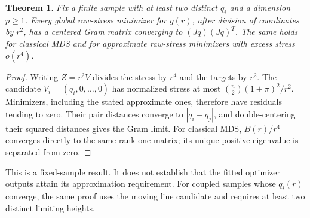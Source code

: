 \documentclass[11pt]{article}
\newtheorem{theorem}[proposition]{Theorem}
\begin{document}
\begin{theorem}\label{thm:paraboloid}
Fix a finite sample with at least two distinct $q_i$ and a dimension $p\ge1$.
Every global raw-stress minimizer for $g(r)$, after division of coordinates
by $r^2$, has a centered Gram matrix converging to $(Jq)(Jq)^T$. The same
holds for classical MDS and for approximate raw-stress minimizers with
excess stress $o(r^4)$.
\end{theorem}
\begin{proof}
Writing $Z=r^2V$ divides the stress by $r^4$ and the targets by $r^2$.
The candidate $V_i=(q_i,0,\ldots,0)$ has normalized stress at most
$\binom n2(1+\pi)^2/r^2$. Minimizers, including the stated approximate ones,
therefore have residuals tending to zero. Their pair distances converge to
$|q_i-q_j|$, and double-centering their squared distances gives the Gram limit.
For classical MDS, $B(r)/r^4$ converges directly to the same rank-one matrix;
its unique positive eigenvalue is separated from zero.
\end{proof}
This is a fixed-sample result. It does not establish that the fitted optimizer
outputs attain its approximation requirement. For coupled samples whose
$q_i(r)$ converge, the same proof uses the moving line candidate and requires
at least two distinct limiting heights.
\end{document}
